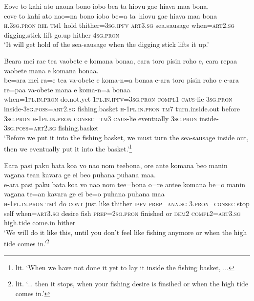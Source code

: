 \newpage
\ea\label{ex:text32-9}
Eove to kahi ato naona bono iobo bea ta hiovu gae hiava maa bona.\\
\gll eove	to	kahi	ato	nao=na	bono	iobo	be=a	ta~hiovu	gae	hiava	maa	bona\\
     \textsc{h}.3\textsc{sg}.\textsc{pron}	\textsc{rel}	\textsc{tm}1	hold	thither=3\textsc{sg}.\textsc{ipfv}	\textsc{art}3.\textsc{sg}	sea.sausage	when=\textsc{art}2.\textsc{sg}	digging.stick	lift	go.up	hither	4\textsc{sg}.\textsc{pron}\\
\glt `It will get hold of the sea-sausage when the digging stick lifts it up.'
\z

\ea\label{ex:text32-10}
Beara mei rae tea vaobete e komana bonaa, eara toro pisin roho e, eara repaa vaobete mana e komana bonaa.\\
\gll be=ara	mei	ra=e	tea	va-obete	e	koma-n=a	bonaa	e-ara	toro	pisin	roho	e	e-ara	re=paa	va-obete	mana	e	koma-n=a	bonaa\\
     when=1\textsc{pl}.\textsc{in}.\textsc{pron}	do.not.yet	1\textsc{pl}.\textsc{in}.\textsc{ipfv}=3\textsc{sg}.\textsc{pron}	\textsc{compl}1	\textsc{caus}-lie	3\textsc{sg}.\textsc{pron}	inside-3\textsc{sg}.\textsc{poss}=\textsc{art}2.\textsc{sg}	fishing.basket	\textsc{h}-1\textsc{pl}.\textsc{in}.\textsc{pron}	\textsc{tm}7	turn.inside.out	before	3\textsc{sg}.\textsc{pron}	\textsc{h}-1\textsc{pl}.\textsc{in}.\textsc{pron}	\textsc{consec}=\textsc{tm}3	\textsc{caus}-lie	eventually	3\textsc{sg}.\textsc{pron}	inside-3\textsc{sg}.\textsc{poss}=\textsc{art}2.\textsc{sg}	fishing.basket\\
\glt `Before we put it into the fishing basket, we must turn the sea-sausage inside out, then we eventually put it into the basket.'\footnote{lit. `When we have not done it yet to lay it inside the fishing basket, ...}
\z

\ea\label{ex:text32-11}
Eara pasi paku bata koa vo nao nom teebona, ore ante komana beo manin vagana tean kavara ge ei beo puhana puhana maa.\\
\gll e-ara	pasi	paku	bata	koa	vo	nao	nom	tee=bona	o=re	antee	komana	be=o	manin	vagana	te=an	kavara	ge	ei	be=o	puhana	puhana	maa\\
     \textsc{h}-1\textsc{pl}.\textsc{in}.\textsc{pron}	\textsc{tm}4	do	\textsc{cont}	just	like	thither	\textsc{ipfv}	\textsc{prep}=\textsc{ana}.\textsc{sg}	3.\textsc{pron}=\textsc{consec}	stop	self	when=\textsc{art}3.\textsc{sg}	desire	fish	\textsc{prep}=2\textsc{sg}.\textsc{pron}	finished	or	\textsc{dem}2	\textsc{compl}2=\textsc{art}3.\textsc{sg}	high.tide	come.in	hither\\
\glt `We will do it like this, until you don't feel like fishing anymore or when the high tide comes in.'\footnote{lit. `... then it stops, when your fishing desire is finsihed or when the high tide comes in.'}
\z

